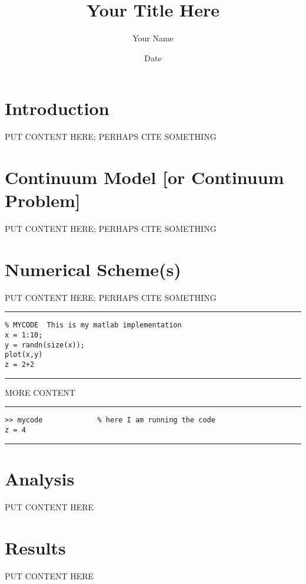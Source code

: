 \documentclass[11pt]{article}
\begin{document}
\title{Your Title Here}

\author{Your Name}

\date{Date}

\maketitle

\section{Introduction}  PUT CONTENT HERE; PERHAPS CITE SOMETHING \cite{einstein}


\section{Continuum Model [or Continuum Problem]}  PUT CONTENT HERE; PERHAPS CITE SOMETHING \cite{ockendonetal}

\section{Numerical Scheme(s)}  PUT CONTENT HERE; PERHAPS CITE SOMETHING \cite{leveque}

\bigskip
\hrule
\begin{verbatim}
% MYCODE  This is my matlab implementation
x = 1:10;
y = randn(size(x));
plot(x,y)
z = 2+2
\end{verbatim}
\hrule
\bigskip

MORE CONTENT

\bigskip
\hrule
\begin{verbatim}
>> mycode             % here I am running the code
z = 4
\end{verbatim}
\hrule

\section{Analysis}  PUT CONTENT HERE

\section{Results}  PUT CONTENT HERE
\end{document}
